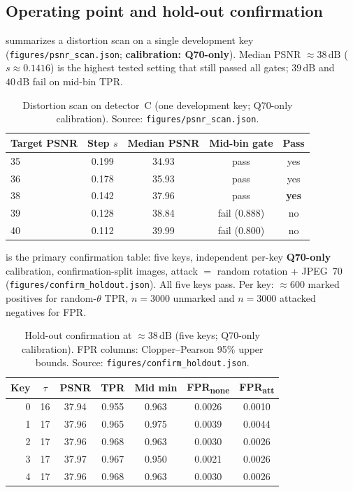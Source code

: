 \documentclass[11pt,a4paper]{article}
\begin{document}
\subsection{Operating point and hold-out confirmation}
\label{sec:main}

 summarizes a distortion scan on a single development key
(\texttt{figures/psnr\_scan.json}; \textbf{calibration: Q70-only}).
Median PSNR \(\approx 38\,\mathrm{dB}\) (\(s\approx 0.1416\)) is the highest tested
setting that still passed all gates; \(39\,\mathrm{dB}\) and \(40\,\mathrm{dB}\) fail on
mid-bin TPR.

\begin{table}[t]
\centering
\caption{Distortion scan on detector~C (one development key; Q70-only calibration).
Source: \texttt{figures/psnr\_scan.json}.}
\label{tab:psnr-scan}
\begin{tabular}{@{}lcccc@{}}
\toprule
Target PSNR & Step \(s\) & Median PSNR & Mid-bin gate & Pass \\
\midrule
35 & 0.199 & 34.93 & pass & yes \\
36 & 0.178 & 35.93 & pass & yes \\
38 & 0.142 & 37.96 & pass & \textbf{yes} \\
39 & 0.128 & 38.84 & fail (\(0.888\)) & no \\
40 & 0.112 & 39.99 & fail (\(0.800\)) & no \\
\bottomrule
\end{tabular}
\end{table}

 is the primary confirmation table: five keys, independent
per-key \textbf{Q70-only} calibration, confirmation-split images, attack $=$ random
rotation + JPEG~70 (\texttt{figures/confirm\_holdout.json}).
All five keys pass.
Per key: \(\approx 600\) marked positives for random-\(\theta\) TPR,
\(n=3000\) unmarked and \(n=3000\) attacked negatives for FPR.

\begin{table}[t]
\centering
\caption{Hold-out confirmation at \(\approx 38\,\mathrm{dB}\) (five keys; Q70-only
calibration).
FPR columns: Clopper--Pearson 95\% upper bounds.
Source: \texttt{figures/confirm\_holdout.json}.}
\label{tab:confirm}
\begin{tabular}{@{}rcccccc@{}}
\toprule
Key & \(\tau\) & PSNR & TPR & Mid min & FPR\textsubscript{none} & FPR\textsubscript{att} \\
\midrule
0 & 16 & 37.94 & 0.955 & 0.963 & 0.0026 & 0.0010 \\
1 & 17 & 37.96 & 0.965 & 0.975 & 0.0039 & 0.0044 \\
2 & 17 & 37.96 & 0.968 & 0.963 & 0.0030 & 0.0026 \\
3 & 17 & 37.97 & 0.967 & 0.950 & 0.0021 & 0.0026 \\
4 & 17 & 37.96 & 0.968 & 0.963 & 0.0030 & 0.0026 \\
\bottomrule
\end{tabular}
\end{table}
\end{document}
